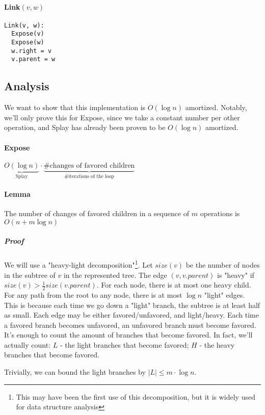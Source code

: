 \documentclass[a4paper]{article}
\begin{document}
\paragraph{Link$(v,w)$}
\begin{lstlisting}[frame=L]
Link(v, w):
  Expose(v)
  Expose(w)
  w.right = v
  v.parent = w
\end{lstlisting}

\subsection{Analysis}
We want to show that this implementation is $O(\log n)$ amortized. Notably, we'll only prove this for Expose, since we take a constant number per other operation, and Splay has already been proven to be $O(\log n)$ amortized.

\paragraph{Expose}
$\underbrace{O(\log n)}_{\text{Splay}} \cdot \underbrace{\text{\# changes of favored children}}_{\text{\# iterations of the loop}}$

\paragraph{Lemma}
The number of changes of favored children in a sequence of $m$ operations is $O(n + m \log n)$

\subparagraph{Proof}
We will use a "heavy-light decomposition"\footnote{This may have been the first use of this decomposition, but it is widely used for data structure analysis}.
Let $size(v)$ be the number of nodes in the subtree of $v$ in the represented tree.
The edge $(v, v.parent)$ is "heavy" if $size(v) > \frac{1}{2} size(v.parent)$.
For each node, there is at most one heavy child.
For any path from the root to any node, there is at most $\log n$ "light" edges.
This is because each time we go down a "light" branch, the subtree is at least half as small.
Each edge may be either favored/unfavored, and light/heavy.
Each time a favored branch becomes unfavored, an unfavored branch must become favored.
It's enough to count the amount of branches that become favored.
In fact, we'll actually count: $L$ - the light branches that become favored; $H$ - the heavy branches that become favored.

Trivially, we can bound the light branches by $|L| \le m \cdot \log n$.
\end{document}
